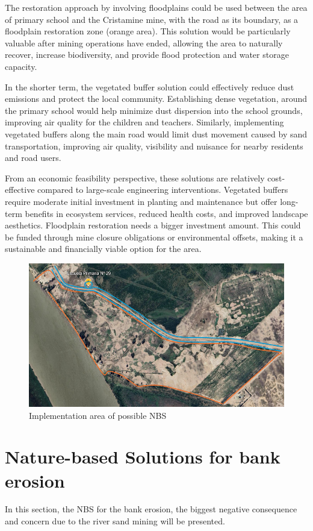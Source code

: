 The restoration approach by involving floodplains could be used between the area of primary school and the Cristamine mine, with the road as its boundary, as a floodplain restoration zone (orange area). This solution would be particularly valuable after mining operations have ended, allowing the area to naturally recover, increase biodiversity, and provide flood protection and water storage capacity.

In the shorter term, the vegetated buffer solution could effectively reduce dust emissions and protect the local community. Establishing dense vegetation, around the primary school would help minimize dust dispersion into the school grounds, improving air quality for the children and teachers.
Similarly, implementing vegetated buffers along the main road would limit dust movement caused by sand transportation, improving air quality, visibility and nuisance for nearby residents and road users.

From an economic feasibility perspective, these solutions are relatively cost-effective compared to large-scale engineering interventions. Vegetated buffers require moderate initial investment in planting and maintenance but offer long-term benefits in ecosystem services, reduced health costs, and improved landscape aesthetics. Floodplain restoration needs a bigger investment amount. This could be funded through mine closure obligations or environmental offsets, making it a sustainable and financially viable option for the area.


\begin{figure}[H]
    \centering
    \includegraphics[width=0.75\linewidth]{figures//ch8/omgevingschooltje2.png}
    \caption{Implementation area of possible NBS}
    \label{fig:PAI}
\end{figure}

\section{Nature-based Solutions for bank erosion}
In this section, the NBS for the bank erosion, the biggest negative consequence and concern due to the river sand mining will be presented. 

